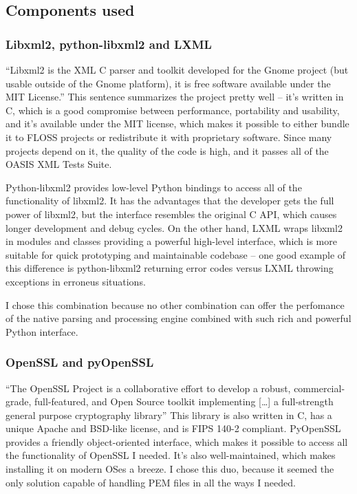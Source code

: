 \subsection{Components used}

\subsubsection{Libxml2, python-libxml2 and LXML}

``Libxml2 is the XML C parser and toolkit developed for the Gnome project (but usable outside of the Gnome platform), it is free software available under the MIT License.''\cite{libxml2-homepage} This sentence summarizes the project pretty well -- it's written in C, which is a good compromise between performance, portability and usability, and it's available under the MIT license, which makes it possible to either bundle it to FLOSS projects or redistribute it with proprietary software. Since many projects depend on it, the quality of the code is high, and it passes all of the OASIS XML Tests Suite.

Python-libxml2 provides low-level Python bindings to access all of the functionality of libxml2. It has the advantages that the developer gets the full power of libxml2, but the interface resembles the original C API, which causes longer development and debug cycles. On the other hand, LXML\cite{lxml-homepage} wraps libxml2 in modules and classes providing a powerful high-level interface, which is more suitable for quick prototyping and maintainable codebase -- one good example of this difference is python-libxml2 returning error codes versus LXML throwing exceptions in erroneus situations.

I chose this combination because no other combination can offer the perfomance of the native parsing and processing engine combined with such rich and powerful Python interface.

\subsubsection{OpenSSL and pyOpenSSL}

``The OpenSSL Project is a collaborative effort to develop a robust, commercial-grade, full-featured, and Open Source toolkit implementing [\ldots] a full-strength general purpose cryptography library''\cite{openssl-homepage} This library is also written in C, has a unique Apache and BSD-like license, and is FIPS 140-2 compliant. PyOpenSSL provides a friendly object-oriented interface, which makes it possible to access all the functionality of OpenSSL I needed. It's also well-maintained, which makes installing it on modern OSes a breeze. I chose this duo, because it seemed the only solution capable of handling PEM files in all the ways I needed.


